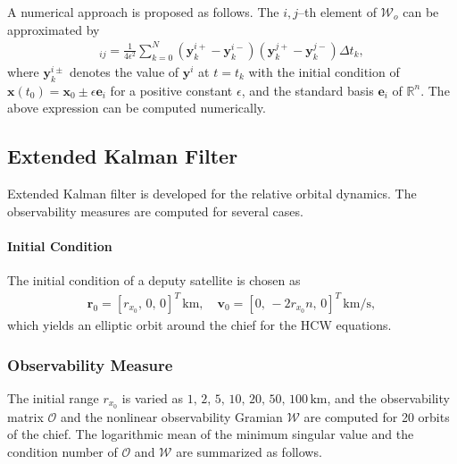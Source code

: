 \documentclass[10pt]{article}
\renewcommand{\Re}{\ensuremath{\mathbb{R}}}
\newcommand{\x}{\ensuremath{\mathbf{x}}}
\newcommand{\y}{\mathbf{y}}
\begin{document}
A numerical approach is proposed as follows. The $i,j$--th element of $\mathcal{W}_o$ can be approximated by
\begin{align}
[\mathcal{W}]_{ij} = \frac{1}{4\epsilon^2}\sum_{k=0}^N (\y^{i+}_k-\y^{i-}_k)(\y^{j+}_k-\y^{j-}_k) \Delta t_k,
\end{align}
where $\y^{i\pm}_k$ denotes the value of $\y^i$ at $t=t_k$ with the initial condition of $\x(t_0)=\x_0\pm \epsilon \mathbf{e}_i $ for a positive constant $\epsilon$, and the standard basis $\mathbf{e}_i$ of $\Re^n$.  The above expression can be computed numerically.

\subsection{Extended Kalman Filter}

Extended Kalman filter is developed for the relative orbital dynamics. The observability measures are computed for several cases. 

\paragraph{Initial Condition}

The initial condition of a deputy satellite is chosen as
\begin{align*}
\mathbf{r}_0=[r_{x_0},\, 0,\, 0]^T\,\mathrm{km},\quad \mathbf{v}_0=[0,\, -2r_{x_0}n,\, 0]^T\,\mathrm{km/s},
\end{align*}
which yields an elliptic orbit around the chief for the HCW equations.


\subsubsection{Observability Measure}

The initial range $r_{x_0}$ is varied as $1,\,2,\,5,\,10,\,20,\,50,\,100\,\mathrm{km}$, and the observability matrix $\mathcal{O}$ and the nonlinear observability Gramian $\mathcal{W}$ are computed for 20 orbits of the chief. The logarithmic mean of the minimum singular value and the condition number of $\mathcal{O}$ and $\mathcal{W}$ are summarized as follows.

\end{document}
